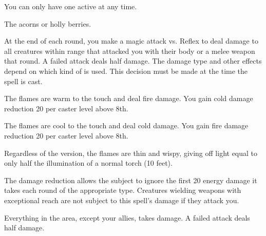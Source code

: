 \begin{spellnotes}
  You can only have one  active at any time.
\end{spellnotes}
\par {} The acorns or holly berries.

\spellrng{\rngpers/\rngclose}
\begin{spelleffect}
    At the end of each round, you make a magic attack vs. Reflex to deal damage to all creatures within \rngclose range that attacked you with their body or a melee weapon that round. A failed attack deals half damage. The damage type and other effects depend on which kind of  is used. This decision must be made at the time the spell is cast.

  \par {} The flames are warm to the touch and deal fire damage. You gain cold damage reduction 20  per caster level above 8th.
  \par {} The flames are cool to the touch and deal cold damage. You gain fire damage reduction 20  per caster level above 8th.

  Regardless of the version, the flames are thin and wispy, giving off light equal to only half the illumination of a normal torch (10 feet).
\end{spelleffect}
\begin{spellnotes}
  The damage reduction allows the subject to ignore the first 20 energy damage it takes each round of the appropriate type. Creatures wielding weapons with exceptional reach are not subject to this spell's damage if they attack you.
\end{spellnotes}

\spellrng{\rngmed}
\begin{spelleffect}
    Everything in the area, except your allies, takes damage. A failed attack deals half damage.
\end{spelleffect}

